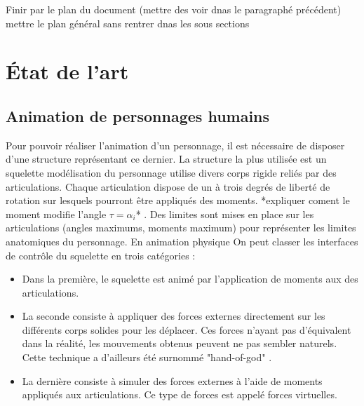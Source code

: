 \documentclass[runningheads,a4paper]{llncs}
\begin{document}
Finir par le plan du document (mettre des voir dnas le paragraphé précédent)
mettre le plan général sans rentrer dnas les sous sections


%
\section{État de l'art}
%
\subsection{Animation de personnages humains} 
Pour pouvoir réaliser l'animation d'un personnage, il est nécessaire de disposer d'une structure représentant ce dernier. La structure la plus utilisée est un squelette modélisation du personnage utilise divers corps rigide reliés par des articulations. Chaque articulation dispose de un à trois degrés de liberté de rotation sur lesquels pourront être appliqués des moments. *expliquer coment le moment modifie l'angle $\tau=\alpha_i$* . Des limites sont mises en place sur les articulations (angles maximums, moments maximum) pour représenter les limites anatomiques du personnage. 
 En animation physique On peut classer les interfaces de contrôle du squelette en trois catégories \cite{geijtenbeek2012interactive}:
\begin{itemize}
\item{Dans la première, le squelette est animé par l'application de moments aux des articulations.}
\item{La seconde consiste à appliquer des forces externes directement sur les différents corps solides pour les déplacer. Ces forces n'ayant pas d'équivalent dans la réalité, les mouvements obtenus peuvent ne pas sembler naturels. Cette technique a d'ailleurs été surnommé "hand-of-god" \cite{van1995guided}. }
\item{La dernière consiste à simuler des forces externes à l'aide de moments appliqués aux articulations. Ce type de forces est appelé forces virtuelles.}
\end{itemize}
\end{document}
